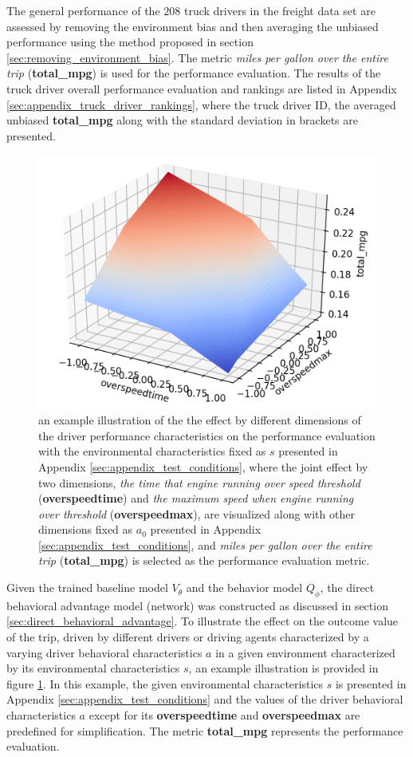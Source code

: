 \documentclass{article}
\begin{document}
The general performance of the $ 208 $ truck drivers in the freight data set are assessed by removing the environment bias and then averaging the unbiased performance using the method proposed in section \ref{sec:removing_environment_bias}. The metric \textit{miles per gallon over the entire trip} (\textbf{total\_mpg}) is used for the performance evaluation. The results of the truck driver overall performance evaluation and rankings are listed in Appendix \ref{sec:appendix_truck_driver_rankings}, where the truck driver ID, the averaged unbiased \textbf{total\_mpg} along with the standard deviation in brackets are presented.

\begin{figure}[H]
    \centering
    \includegraphics[width=0.5\linewidth]{figures/optimal_placement_example.png}
    \caption{an example illustration of the the effect by different dimensions of the driver performance characteristics on the performance evaluation with the environmental characteristics fixed as $ s $ presented in Appendix \ref{sec:appendix_test_conditions}, where the joint effect by two dimensions, \textit{the time that engine running over speed threshold} (\textbf{overspeedtime}) and \textit{the maximum speed when engine running over threshold} (\textbf{overspeedmax}), are visualized along with other dimensions fixed as $ a_{0} $ presented in Appendix \ref{sec:appendix_test_conditions}, and \textit{miles per gallon over the entire trip} (\textbf{total\_mpg}) is selected as the performance evaluation metric.}
    \label{fig:optimal_placement_example}
\end{figure}

Given the trained baseline model $ V_{\theta} $ and the behavior model $ Q_{\phi} $, the direct behavioral advantage model (network) was constructed as discussed in section \ref{sec:direct_behavioral_advantage}. To illustrate the effect on the outcome value of the trip, driven by different drivers or driving agents characterized by a varying driver behavioral characteristics $ a $ in a given environment characterized by its environmental characteristics $ s $, an example illustration is provided in figure \ref{fig:optimal_placement_example}. In this example, the given environmental characteristics $ s $ is presented in Appendix \ref{sec:appendix_test_conditions} and the values of the driver behavioral characteristics $ a $ except for its \textbf{overspeedtime} and \textbf{overspeedmax} are predefined for simplification. The metric \textbf{total\_mpg} represents the performance evaluation.
\end{document}
